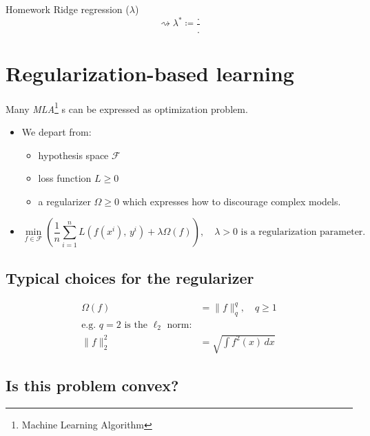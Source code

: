 \begin{exercise}{Homework}{}
Ridge regression ($\lambda$)
\begin{equation}
	\rightsquigarrow \lambda ^* \coloneqq \frac{.}{.}
\end{equation}
\end{exercise}

\section{Regularization-based learning} %
\label{sec:Regularization-based-learning}

Many \emph{MLA}\footnote{Machine Learning Algorithm}%
s can be expressed as optimization problem.

\begin{itemize}
	\item We depart from:
	      \begin{itemize}
		      \item hypothesis space $\mathcal{F}$
		      \item loss function $L \geq 0$
		      \item a regularizer $\Omega \geq 0$ which expresses how to discourage complex models.
	      \end{itemize}
	\item
\[
	\min_{f \in \mathcal{F}} \left(\frac{1}{n} \sum_{i=1}^n L\left(f(x^i),\, y^i\right) + \lambda\Omega(f) \right)
	, \quad \lambda > 0 \text{ is a regularization parameter.}
\]

\end{itemize}

\subsection{Typical choices for the regularizer} %

\begin{align*}
	\Omega(f) & = \lVert f \rVert_q^q, \quad q \geq 1                 \\
	\text{e.g. } q = 2 \text{ is the } \ell_2 \text{ norm:} \\
	\lVert f \rVert_2^2 & = \sqrt{\int f^2(x) \, dx}
\end{align*}

\subsection*{Is this problem convex?} %

